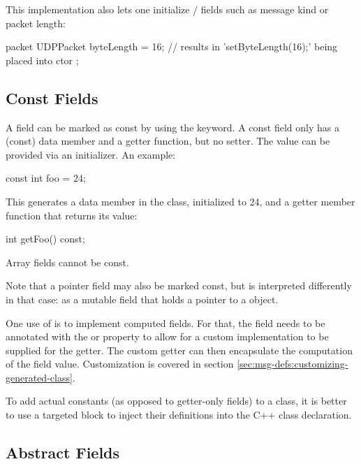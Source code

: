 This implementation also lets one initialize  /
fields such as message kind or packet length:

\begin{msg}
packet UDPPacket
{
    byteLength = 16;  // results in 'setByteLength(16);' being placed into ctor
};
\end{msg}


\subsection{Const Fields}
\label{sec:msg-defs:const-fields}

A field can be marked as const by using the  keyword. A
const field only has a (const) data member and a getter function, but no
setter. The value can be provided via an initializer. An example:

\begin{msg}
const int foo = 24;
\end{msg}

This generates a  data member in the class, initialized to 24,
and a getter member function that returns its value:

\begin{cpp}
int getFoo() const;
\end{cpp}

Array fields cannot be const.

Note that a pointer field may also be marked const, but  is
interpreted differently in that case: as a mutable field that holds a pointer to
a  object.

One use of  is to implement computed fields. For that, the field
needs to be annotated with the  or  property
to allow for a custom implementation to be supplied for the getter. The custom
getter can then encapsulate the computation of the field value. Customization is
covered in section \ref{sec:msg-defs:customizing-generated-class}.

\begin{note}
To add actual constants (as opposed to getter-only fields) to a class, it is
better to use a targeted  block to inject their definitions
into the C++ class declaration.
\end{note}


\subsection{Abstract Fields}
\label{sec:msg-defs:abstract-fields}

